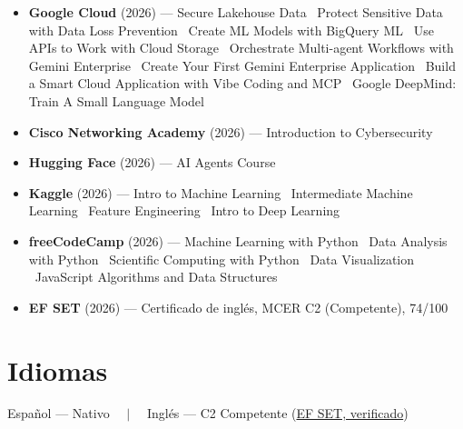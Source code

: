 \begin{itemize}
  \item \textbf{Google Cloud} (2026) --- Secure Lakehouse Data \textbullet\ Protect Sensitive Data
        with Data Loss Prevention \textbullet\ Create ML Models with BigQuery ML \textbullet\ Use
        APIs to Work with Cloud Storage \textbullet\ Orchestrate Multi-agent Workflows with Gemini
        Enterprise \textbullet\ Create Your First Gemini Enterprise Application \textbullet\ Build a
        Smart Cloud Application with Vibe Coding and MCP \textbullet\ Google DeepMind: Train A Small
        Language Model
  \item \textbf{Cisco Networking Academy} (2026) --- Introduction to Cybersecurity
  \item \textbf{Hugging Face} (2026) --- AI Agents Course
  \item \textbf{Kaggle} (2026) --- Intro to Machine Learning \textbullet\ Intermediate Machine Learning
        \textbullet\ Feature Engineering \textbullet\ Intro to Deep Learning
  \item \textbf{freeCodeCamp} (2026) --- Machine Learning with Python \textbullet\ Data Analysis
        with Python \textbullet\ Scientific Computing with Python \textbullet\ Data Visualization
        \textbullet\ JavaScript Algorithms and Data Structures
  \item \textbf{EF SET} (2026) --- Certificado de inglés, MCER C2 (Competente), 74/100
\end{itemize}
\fi

\ifonepage\else
\section{Idiomas}
Español --- Nativo \ \ {\color{subtle}$\vert$} \ \ Inglés --- C2 Competente
(\href{https://cert.efset.org/es/qpqdd3}{EF SET, verificado})
\fi


